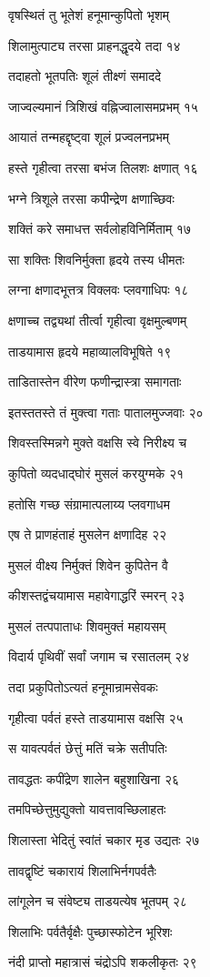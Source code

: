 वृषस्थितं तु भूतेशं हनूमान्कुपितो भृशम्

शिलामुत्पाट्य तरसा प्राहनद्धृदये तदा १४

तदाहतो भूतपतिः शूलं तीक्ष्णं समाददे

जाज्वल्यमानं त्रिशिखं वह्निज्वालासमप्रभम् १५

आयातं तन्महद्दृष्ट्वा शूलं प्रज्वलनप्रभम्

हस्ते गृहीत्वा तरसा बभंज तिलशः क्षणात् १६

भग्ने त्रिशूले तरसा कपीन्द्रेण क्षणाच्छिवः

शक्तिं करे समाधत्त सर्वलोहविनिर्मिताम् १७

सा शक्तिः शिवनिर्मुक्ता हृदये तस्य धीमतः

लग्ना क्षणादभूत्तत्र विक्लवः प्लवगाधिपः १८

क्षणाच्च तद्व्यथां तीर्त्वा गृहीत्वा वृक्षमुल्बणम्

ताडयामास हृदये महाव्यालविभूषिते १९

ताडितास्तेन वीरेण फणीन्द्रास्त्रा समागताः

इतस्ततस्ते तं मुक्त्वा गताः पातालमुज्जवाः २०

शिवस्तस्मिन्नगे मुक्ते वक्षसि स्वे निरीक्ष्य च

कुपितो व्यदधाद्घोरं मुसलं करयुग्मके २१

हतोसि गच्छ संग्रामात्पलाय्य प्लवगाधम

एष ते प्राणहंताहं मुसलेन क्षणादिह २२

मुसलं वीक्ष्य निर्मुक्तं शिवेन कुपितेन वै

कीशस्तद्वंचयामास महावेगाद्धरिं स्मरन् २३

मुसलं तत्पपाताधः शिवमुक्तं महायसम्

विदार्य पृथिवीं सर्वां जगाम च रसातलम् २४

तदा प्रकुपितोऽत्यतं हनूमान्रामसेवकः

गृहीत्वा पर्वतं हस्ते ताडयामास वक्षसि २५

स यावत्पर्वतं छेत्तुं मतिं चक्रे सतीपतिः

तावद्धतः कपींद्रेण शालेन बहुशाखिना २६

तमपिच्छेत्तुमुद्युक्तो यावत्तावच्छिलाहतः

शिलास्ता भेदितुं स्वांतं चकार मृड उद्यतः २७

तावद्वृष्टिं चकारायं शिलाभिर्नगपर्वतैः

लांगूलेन च संवेष्ट्य ताडयत्येष भूतपम् २८

शिलाभिः पर्वतैर्वृक्षैः पुच्छास्फोटेन भूरिशः

नंदी प्राप्तो महात्रासं चंद्रोऽपि शकलीकृतः २९

